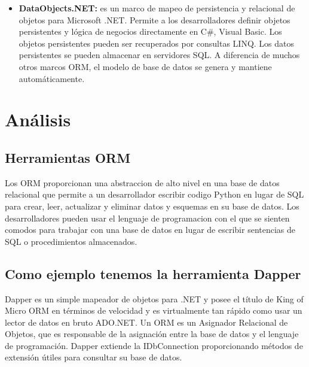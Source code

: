 \documentclass[preprint,12pt]{elsarticle}
\begin{document}
\begin{itemize}
	\item \textbf{DataObjects.NET:} es un marco de mapeo de persistencia y relacional de objetos para Microsoft .NET. Permite a los desarrolladores definir objetos persistentes y lógica de negocios directamente en C\#, Visual Basic. Los objetos persistentes pueden ser recuperados por consultas LINQ. Los datos persistentes se pueden almacenar en servidores SQL. A diferencia de muchos otros marcos ORM, el modelo de base de datos se genera y mantiene automáticamente.\cite{do} \\
\end{itemize}



 



\section{Análisis}

\subsection{\textbf{Herramientas ORM}}
Los ORM proporcionan una abstraccion de alto nivel
en una base de datos relacional que permite a un desarrollador escribir codigo Python en lugar de SQL para crear, leer, actualizar y eliminar datos y esquemas en su base de datos. Los desarrolladores pueden usar el lenguaje de programacion con el que se sienten comodos para trabajar con una base de datos en lugar de escribir sentencias de SQL o procedimientos almacenados.\\

\subsection{\textbf{Como ejemplo tenemos la herramienta Dapper}}
Dapper es un simple mapeador de objetos para .NET y posee el título de King of Micro ORM en términos de velocidad y es virtualmente tan rápido como usar un lector de datos en bruto ADO.NET. Un ORM es un Asignador Relacional de Objetos, que es responsable de la asignación entre la base de datos y el lenguaje de programación.
Dapper extiende la IDbConnection proporcionando métodos de extensión útiles para consultar su base de datos. \citep{DapperNet}
\end{document}

